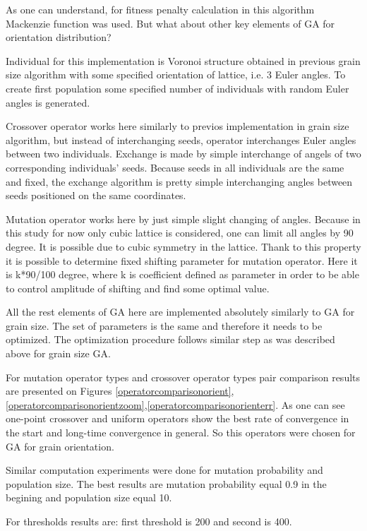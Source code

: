 \documentclass[12pt]{report}
\begin{document}
As one can understand, for fitness penalty calculation in this algorithm Mackenzie function was used. But what about other key elements of GA for orientation distribution? 

Individual for this implementation is Voronoi structure obtained in previous grain size algorithm with some specified orientation of lattice, i.e. 3 Euler angles. To create first population some specified number of individuals with random Euler angles is generated.

Crossover operator works here similarly to previos implementation in grain size algorithm, but instead of interchanging seeds, operator interchanges Euler angles between two individuals. Exchange is made by simple interchange of angels of two corresponding individuals' seeds. Because seeds in all individuals are the same and fixed, the exchange algorithm is pretty simple interchanging angles between seeds positioned on the same coordinates.

Mutation operator works here by just simple slight changing of angles. Because in this study for now only cubic lattice is considered, one can limit all angles by 90 degree. It is possible due to cubic symmetry in the lattice. Thank to this property it is possible to determine fixed shifting parameter for mutation operator. Here it is k*90/100 degree, where k is coefficient defined as parameter in order to be able to control amplitude of shifting and find some optimal value.

All the rest elements of GA here are implemented absolutely similarly to GA for grain size. The set of parameters is the same and therefore it needs to be optimized. The optimization procedure follows similar step as was described above for grain size GA.

For mutation operator types and crossover operator types pair comparison results are presented on Figures \ref{operatorcomparisonorient}, \ref{operatorcomparisonorientzoom},\ref{operatorcomparisonorienterr}. As one can see one-point crossover and uniform operators show the best rate of convergence in the start and long-time convergence in general. So this operators were chosen for GA for grain orientation.

Similar computation experiments were done for mutation probability and population size. The best results are mutation probability equal 0.9 in the begining and population size equal 10.

For thresholds results are: first threshold is 200 and second is 400.
\end{document}
